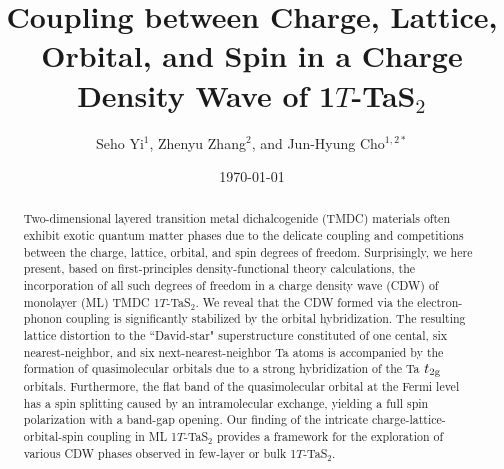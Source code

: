 \documentclass[aps,prl,twocolumn,showpacs,byrevtex]{revtex4}
\begin{document}
\title{Coupling between Charge, Lattice, Orbital, and Spin in a Charge Density Wave of 1$T$-TaS$_2$}
\author{Seho Yi$^1$, Zhenyu Zhang$^2$, and Jun-Hyung Cho$^{1,2*}$}
\date{\today}

\begin{abstract}
Two-dimensional layered transition metal dichalcogenide (TMDC) materials often exhibit exotic quantum matter phases due to the delicate coupling and competitions between the charge, lattice, orbital, and spin degrees of freedom. Surprisingly, we here present, based on first-principles density-functional theory calculations, the incorporation of all such degrees of freedom in a charge density wave (CDW) of monolayer (ML) TMDC 1$T$-TaS$_2$. We reveal that the CDW formed via the electron-phonon coupling is significantly stabilized by the orbital hybridization. The resulting lattice distortion to the ``David-star" superstructure constituted of one cental, six nearest-neighbor, and six next-nearest-neighbor Ta atoms is accompanied by the formation of quasimolecular orbitals due to a strong hybridization of the Ta $t_{\rm 2g}$ orbitals. Furthermore, the flat band of the quasimolecular orbital at the Fermi level has a spin splitting caused by an intramolecular exchange, yielding a full spin polarization with a band-gap opening. Our finding of the intricate charge-lattice-orbital-spin coupling in ML 1$T$-TaS$_2$ provides a framework for the exploration of various CDW phases observed in few-layer or bulk 1$T$-TaS$_2$.


\end{abstract}
\maketitle

\end{document}
